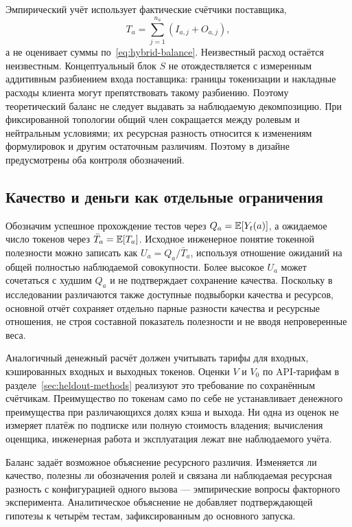 Эмпирический учёт использует фактические счётчики поставщика,
\begin{equation}
T_a=\sum_{j=1}^{n_a}(I_{a,j}+O_{a,j}),
\label{eq:hybrid-observed-ledger}
\end{equation}
а не оценивает суммы по~\eqref{eq:hybrid-balance}. Неизвестный расход остаётся неизвестным. Концептуальный блок $S$ не отождествляется с измеренным аддитивным разбиением входа поставщика: границы токенизации и накладные расходы клиента могут препятствовать такому разбиению. Поэтому теоретический баланс не следует выдавать за наблюдаемую декомпозицию. При фиксированной топологии общий член сокращается между ролевым и нейтральным условиями; их ресурсная разность относится к изменениям формулировок и другим остаточным различиям. Поэтому в дизайне предусмотрены оба контроля обозначений.

\subsection{Качество и деньги как отдельные ограничения}
Обозначим успешное прохождение тестов через $Q_a=\mathbb{E}[Y_t(a)]$, а ожидаемое число токенов через $\bar T_a=\mathbb{E}[T_a]$. Исходное инженерное понятие токенной полезности можно записать как $U_a=Q_a/\bar T_a$, используя отношение ожиданий на общей полностью наблюдаемой совокупности. Более высокое $U_a$ может сочетаться с худшим $Q_a$ и не подтверждает сохранение качества. Поскольку в исследовании различаются также доступные подвыборки качества и ресурсов, основной отчёт сохраняет отдельно парные разности качества и ресурсные отношения, не строя составной показатель полезности и не вводя непроверенные веса.

Аналогичный денежный расчёт должен учитывать тарифы для входных, кэшированных входных и выходных токенов. Оценки $V$ и $V_0$ по API-тарифам в разделе~\ref{sec:heldout-methods} реализуют это требование по сохранённым счётчикам. Преимущество по токенам само по себе не устанавливает денежного преимущества при различающихся долях кэша и выхода. Ни одна из оценок не измеряет платёж по подписке или полную стоимость владения; вычисления оценщика, инженерная работа и эксплуатация лежат вне наблюдаемого учёта.

Баланс задаёт возможное объяснение ресурсного различия. Изменяется ли качество, полезны ли обозначения ролей и связана ли наблюдаемая ресурсная разность с конфигурацией одного вызова --- эмпирические вопросы факторного эксперимента. Аналитическое объяснение не добавляет подтверждающей гипотезы к четырём тестам, зафиксированным до основного запуска.
